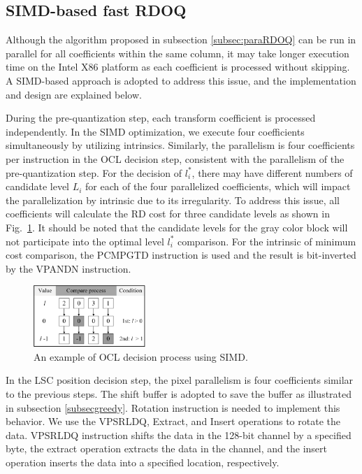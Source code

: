 \documentclass[lettersize,journal]{IEEEtran}
\begin{document}
\subsection{SIMD-based fast RDOQ} 
Although the algorithm proposed in subsection \ref{subsec:paraRDOQ} can be run in parallel for all coefficients within the same column, it may take longer execution time on the Intel X86 platform as each coefficient is processed without skipping. A SIMD-based approach is adopted to address this issue, and the implementation and design are explained below. 


During the pre-quantization step, each transform coefficient is processed independently. In the SIMD optimization, we execute four coefficients simultaneously by utilizing intrinsics. Similarly, the parallelism is four coefficients per instruction in the OCL decision step, consistent with the parallelism of the pre-quantization step. For the decision of $l_{i}^{*}$, there may have different numbers of candidate level $L_{i}$ for each of the four parallelized coefficients, which will impact the parallelization by intrinsic due to its irregularity. To address this issue, all coefficients will calculate the RD cost for three candidate levels as shown in Fig.~\ref{selection}. It should be noted that the candidate levels for the gray color block will not participate into the optimal level $l_{i}^{*}$ comparison. For the intrinsic of minimum cost comparison, the PCMPGTD instruction is used and the result is bit-inverted by the VPANDN instruction.

\begin{figure}[!h]
	\centering
	\centerline{\includegraphics[width=0.38\textwidth]{figure/SIMDSEL.png}} 
	\caption{An example of OCL decision process using SIMD.}
	\label{selection} %
\end{figure} 

In the LSC position decision step, the pixel parallelism is four coefficients similar to the previous steps. The shift buffer is adopted to save the buffer as illustrated in subsection \ref{subsecgreedy}. Rotation instruction is needed to implement this behavior. We use the VPSRLDQ, Extract, and Insert operations to rotate the data. VPSRLDQ instruction shifts the data in the 128-bit channel by a specified byte, the extract operation extracts the data in the channel, and the insert operation inserts the data into a specified location, respectively. 
\end{document}
